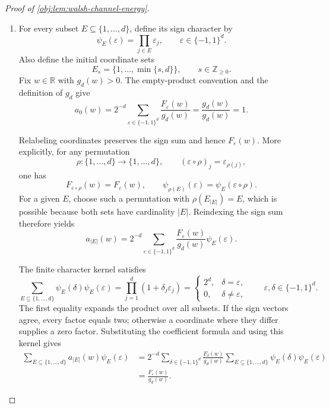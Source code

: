 \begin{proof}[Proof of \cref{obj:lem:walsh-channel-energy}]
\begin{enumerate}
\item For every subset \(E\subseteq\{1,\ldots,d\}\), define its sign character by
\[
\psi_E(\varepsilon)=\prod_{j\in E}\varepsilon_j,
\qquad \varepsilon\in\{-1,1\}^d.
\]
Also define the initial coordinate sets
\[
E_s=\{1,\ldots,\min\{s,d\}\},
\qquad s\in\mathbb Z_{\ge0}.
\]
Fix \(w\in\mathbb R\) with \(g_d(w)>0\). The empty-product convention and the definition of \(g_d\) give
\[
a_0(w)
=2^{-d}\sum_{\varepsilon\in\{-1,1\}^d}
\frac{F_\varepsilon(w)}{g_d(w)}
=\frac{g_d(w)}{g_d(w)}
=1.
\]

Relabeling coordinates preserves the sign sum and hence \(F_\varepsilon(w)\). More explicitly, for any permutation
\[
\rho:\{1,\ldots,d\}\longrightarrow\{1,\ldots,d\},
\qquad
(\varepsilon\circ\rho)_j=\varepsilon_{\rho(j)},
\]
one has
\[
F_{\varepsilon\circ\rho}(w)=F_\varepsilon(w),
\qquad
\psi_{\rho(E)}(\varepsilon)=\psi_E(\varepsilon\circ\rho).
\]
For a given \(E\), choose such a permutation with
\(\rho(E_{|E|})=E\), which is possible because both sets have cardinality \(|E|\). Reindexing the sign sum therefore yields
\[
a_{|E|}(w)
=2^{-d}\sum_{\varepsilon\in\{-1,1\}^d}
\frac{F_\varepsilon(w)}{g_d(w)}\psi_E(\varepsilon).
\]

The finite character kernel satisfies
\[
\sum_{E\subseteq\{1,\ldots,d\}}
\psi_E(\delta)\psi_E(\varepsilon)
=
\prod_{j=1}^d(1+\delta_j\varepsilon_j)
=
\begin{cases}
2^d,&\delta=\varepsilon,\\
0,&\delta\ne\varepsilon,
\end{cases}
\qquad \varepsilon,\delta\in\{-1,1\}^d.
\]
The first equality expands the product over all subsets. If the sign vectors agree, every factor equals two; otherwise a coordinate where they differ supplies a zero factor. Substituting the coefficient formula and using this kernel gives
\[
\begin{aligned}
\sum_{E\subseteq\{1,\ldots,d\}}
a_{|E|}(w)\psi_E(\varepsilon)
&=
2^{-d}\sum_{\delta\in\{-1,1\}^d}
\frac{F_\delta(w)}{g_d(w)}
\sum_{E\subseteq\{1,\ldots,d\}}
\psi_E(\delta)\psi_E(\varepsilon)\\
&=\frac{F_\varepsilon(w)}{g_d(w)}.
\end{aligned}
\]


\end{enumerate}
\end{proof}
